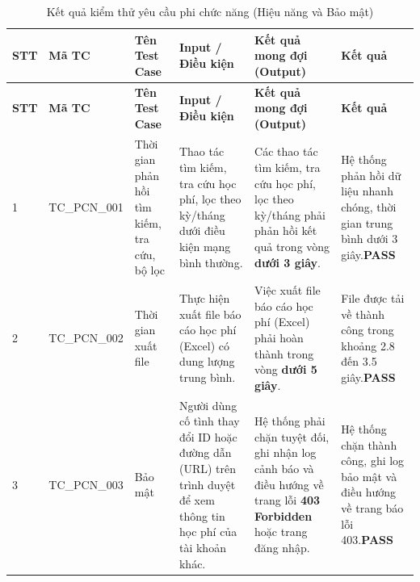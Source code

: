 \vspace{0.4em}
\begin{longtable}{|>{\centering\arraybackslash}p{0.6cm}|>{\centering\arraybackslash}p{2.5cm}|>{\raggedright\arraybackslash}p{3.2cm}|>{\raggedright\arraybackslash}p{3.0cm}|>{\raggedright\arraybackslash}p{3.2cm}|>{\raggedright\arraybackslash}p{3.0cm}|}
\caption{Kết quả kiểm thử yêu cầu phi chức năng (Hiệu năng và Bảo mật)}\label{tab:test-non-functional}\\
\hline
\textbf{STT} & \textbf{Mã TC} & \textbf{Tên Test Case} & \textbf{Input / Điều kiện} & \textbf{Kết quả mong đợi (Output)} & \textbf{Kết quả} \\
\hline
\endfirsthead
\hline
\textbf{STT} & \textbf{Mã TC} & \textbf{Tên Test Case} & \textbf{Input / Điều kiện} & \textbf{Kết quả mong đợi (Output)} & \textbf{Kết quả} \\
\hline
\endhead

1 & TC\_PCN\_001 & Thời gian phản hồi tìm kiếm, tra cứu, bộ lọc & Thao tác tìm kiếm, tra cứu học phí, lọc theo kỳ/tháng dưới điều kiện mạng bình thường. & Các thao tác tìm kiếm, tra cứu học phí, lọc theo kỳ/tháng phải phản hồi kết quả trong vòng \textbf{dưới 3 giây}. & Hệ thống phản hồi dữ liệu nhanh chóng, thời gian trung bình dưới 3 giây.\newline\newline\textbf{PASS} \\ \hline

2 & TC\_PCN\_002 & Thời gian xuất file & Thực hiện xuất file báo cáo học phí (Excel) có dung lượng trung bình. & Việc xuất file báo cáo học phí (Excel) phải hoàn thành trong vòng \textbf{dưới 5 giây}. & File được tải về thành công trong khoảng 2.8 đến 3.5 giây.\newline\newline\textbf{PASS} \\ \hline

3 & TC\_PCN\_003 & Bảo mật & Người dùng cố tình thay đổi ID hoặc đường dẫn (URL) trên trình duyệt để xem thông tin học phí của tài khoản khác. & Hệ thống phải chặn tuyệt đối, ghi nhận log cảnh báo và điều hướng về trang lỗi \textbf{403 Forbidden} hoặc trang đăng nhập. & Hệ thống chặn thành công, ghi log bảo mật và điều hướng về trang báo lỗi 403.\newline\newline\textbf{PASS} \\ \hline

\end{longtable}


